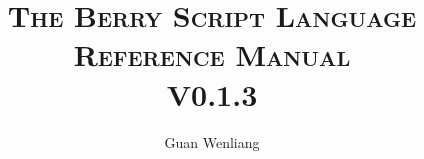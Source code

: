 
\newcommand\nbvspace[1][3]{\vspace*{\stretch{#1}}}
\newcommand\nbstretchyspace{\spaceskip0.5em plus 0.25em minus 0.25em}
\newcommand{\nbtitlestretch}{\spaceskip0.6em}

\newcommand{\cndash}{\raisebox{0.5mm}{------}}

\begin{titlepage}

    \title{\ebgaramond\Huge{\scshape The Berry Script Language\\Reference Manual}\\\Large{V0.1.3}}

    \author{Guan Wenliang}

    \maketitle

\end{titlepage}